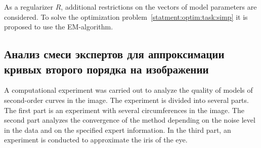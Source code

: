 As a regularizer $R$, additional restrictions on the vectors of model parameters are considered. To solve the optimization problem~\eqref{statment:optim:task:simp} it is proposed to use the EM-algorithm.

\subsection{Анализ смеси экспертов для аппроксимации кривых второго порядка на изображении}
\label{sec:5}

A computational experiment was carried out to analyze the quality of models of second-order curves in the image. The experiment is divided into several parts. The first part is an experiment with several circumferences in the image. The second part analyzes the convergence of the method depending on the noise level in the data and on the specified expert information. In the third part, an experiment is conducted to approximate the iris of the eye.

